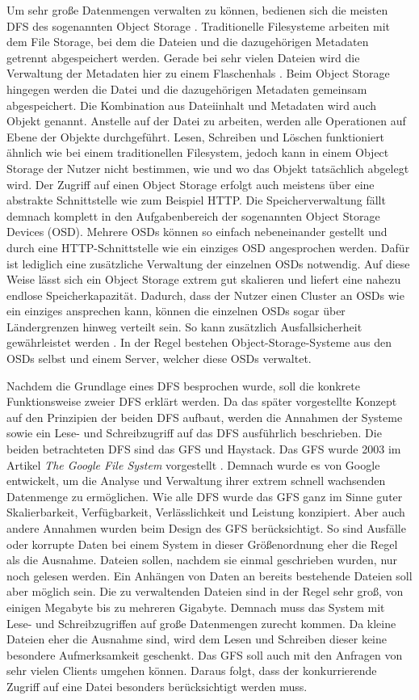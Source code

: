 \documentclass[12pt,oneside,a4paper,parskip]{scrbook}
\begin{document}
Um sehr große Datenmengen verwalten zu können, bedienen sich die meisten DFS des sogenannten Object Storage \cite{cephPaper}. Traditionelle Filesysteme arbeiten mit dem File Storage, bei dem die Dateien und die dazugehörigen Metadaten getrennt abgespeichert werden. Gerade bei sehr vielen Dateien wird die Verwaltung der Metadaten hier zu einem Flaschenhals \cite{filestorage}. Beim Object Storage hingegen werden die Datei und die dazugehörigen Metadaten gemeinsam abgespeichert. Die Kombination aus Dateiinhalt und Metadaten wird auch Objekt genannt. Anstelle auf der Datei zu arbeiten, werden alle Operationen auf Ebene der Objekte durchgeführt. Lesen, Schreiben und Löschen funktioniert ähnlich wie bei einem traditionellen Filesystem, jedoch kann in einem Object Storage der Nutzer nicht bestimmen, wie und wo das Objekt tatsächlich abgelegt wird. Der Zugriff auf einen Object Storage erfolgt auch meistens über eine abstrakte Schnittstelle wie zum Beispiel HTTP. Die Speicherverwaltung fällt demnach komplett in den Aufgabenbereich der sogenannten Object Storage Devices (OSD). Mehrere OSDs können so einfach nebeneinander gestellt und durch eine HTTP-Schnittstelle wie ein einziges OSD angesprochen werden. Dafür ist lediglich eine zusätzliche Verwaltung der einzelnen OSDs notwendig. Auf diese Weise lässt sich ein Object Storage extrem gut skalieren und liefert eine nahezu endlose Speicherkapazität. Dadurch, dass der Nutzer einen Cluster an OSDs wie ein einziges ansprechen kann, können die einzelnen OSDs sogar über Ländergrenzen hinweg verteilt sein. So kann zusätzlich Ausfallsicherheit gewährleistet werden \cite{osvideo}\cite{objectstorage}\cite{objectBasedStorage}. In der Regel bestehen Object-Storage-Systeme aus den OSDs selbst und einem Server, welcher diese OSDs verwaltet.

Nachdem die Grundlage eines DFS besprochen wurde, soll die konkrete Funktionsweise zweier DFS erklärt werden. Da das später vorgestellte Konzept auf den Prinzipien der beiden DFS aufbaut, werden die Annahmen der Systeme sowie ein Lese- und Schreibzugriff auf das DFS ausführlich beschrieben. Die beiden betrachteten DFS sind das GFS und Haystack.
Das GFS wurde 2003 im Artikel \textit{The Google File System} vorgestellt \cite{GFS}. Demnach wurde es von Google entwickelt, um die Analyse und Verwaltung ihrer extrem schnell wachsenden Datenmenge zu ermöglichen. Wie alle DFS wurde das GFS ganz im Sinne guter Skalierbarkeit, Verfügbarkeit, Verlässlichkeit und Leistung konzipiert. Aber auch andere Annahmen wurden beim Design des GFS berücksichtigt. So sind Ausfälle oder korrupte Daten bei einem System in dieser Größenordnung eher die Regel als die Ausnahme. Dateien sollen, nachdem sie einmal geschrieben wurden, nur noch gelesen werden. Ein Anhängen von Daten an bereits bestehende Dateien soll aber möglich sein. Die zu verwaltenden Dateien sind in der Regel sehr groß, von einigen Megabyte bis zu mehreren Gigabyte. Demnach muss das System mit Lese- und Schreibzugriffen auf große Datenmengen zurecht kommen. Da kleine Dateien eher die Ausnahme sind, wird dem Lesen und Schreiben dieser keine besondere Aufmerksamkeit geschenkt. Das GFS soll auch mit den Anfragen von sehr vielen Clients umgehen können. Daraus folgt, dass der konkurrierende Zugriff auf eine Datei besonders berücksichtigt werden muss.  
\end{document}
